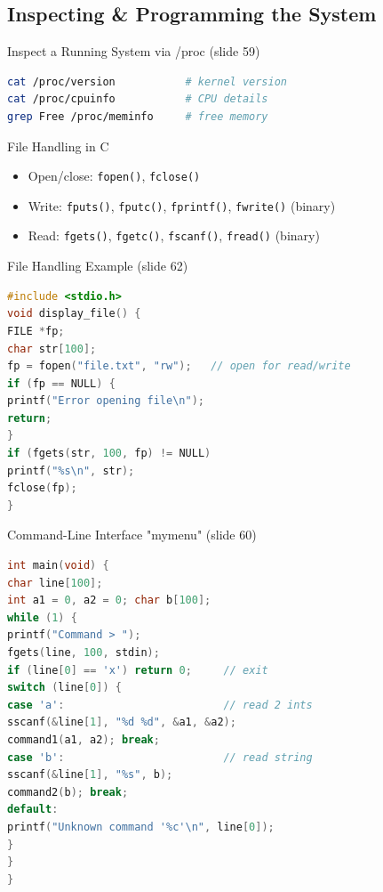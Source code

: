 \raggedcolumns
\columnbreak

\subsection{Inspecting \& Programming the System}

\begin{KR}{Inspect a Running System via /proc (slide 59)}
\begin{lstlisting}[language=bash, style=basesmol, aboveskip=2pt, belowskip=2pt]
cat /proc/version           # kernel version
cat /proc/cpuinfo           # CPU details
grep Free /proc/meminfo     # free memory
\end{lstlisting}
\end{KR}

\begin{definition}{File Handling in C}
    \begin{itemize}
        \item Open/close: \texttt{fopen()}, \texttt{fclose()}
        \item Write: \texttt{fputs()}, \texttt{fputc()}, \texttt{fprintf()}, \texttt{fwrite()} (binary)
        \item Read: \texttt{fgets()}, \texttt{fgetc()}, \texttt{fscanf()}, \texttt{fread()} (binary)
    \end{itemize}
\end{definition}

\begin{examplecode}{File Handling Example (slide 62)}
\begin{lstlisting}[language=C, style=basesmol, aboveskip=2pt, belowskip=2pt]
#include <stdio.h>
void display_file() {
FILE *fp;
char str[100];
fp = fopen("file.txt", "rw");   // open for read/write
if (fp == NULL) {
printf("Error opening file\n");
return;
}
if (fgets(str, 100, fp) != NULL)
printf("%s\n", str);
fclose(fp);
}
\end{lstlisting}
\end{examplecode}

\begin{examplecode}{Command-Line Interface "mymenu" (slide 60)}
\begin{lstlisting}[language=C, style=basesmol, aboveskip=2pt, belowskip=2pt]
int main(void) {
char line[100];
int a1 = 0, a2 = 0; char b[100];
while (1) {
printf("Command > ");
fgets(line, 100, stdin);
if (line[0] == 'x') return 0;     // exit
switch (line[0]) {
case 'a':                         // read 2 ints
sscanf(&line[1], "%d %d", &a1, &a2);
command1(a1, a2); break;
case 'b':                         // read string
sscanf(&line[1], "%s", b);
command2(b); break;
default:
printf("Unknown command '%c'\n", line[0]);
}
}
}
\end{lstlisting}
\end{examplecode}

\raggedcolumns
